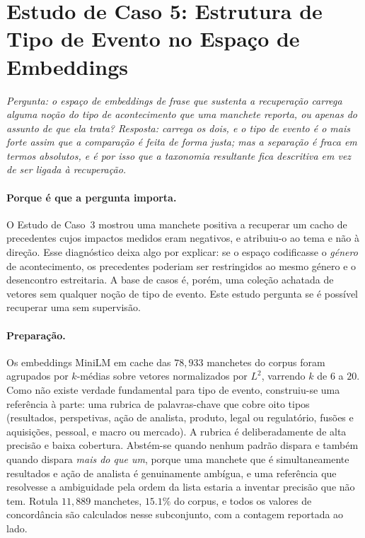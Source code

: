 \section{Estudo de Caso 5: Estrutura de Tipo de Evento no Espaço de Embeddings}
\label{sec:cs_taxonomy}

\emph{Pergunta: o espaço de embeddings de frase que sustenta a recuperação carrega alguma noção do
\emph{tipo de acontecimento} que uma manchete reporta, ou apenas do assunto de que ela trata?
Resposta: carrega os dois, e o tipo de evento é o mais forte assim que a comparação é feita de forma
justa; mas a separação é fraca em termos absolutos, e é por isso que a taxonomia resultante fica
descritiva em vez de ser ligada à recuperação.}

\paragraph{Porque é que a pergunta importa.} O Estudo de Caso~3 mostrou uma manchete positiva a
recuperar um cacho de precedentes cujos impactos medidos eram negativos, e atribuiu-o ao tema e não à
direção. Esse diagnóstico deixa algo por explicar: se o espaço codificasse o \emph{género} de
acontecimento, os precedentes poderiam ser restringidos ao mesmo género e o desencontro estreitaria.
A base de casos é, porém, uma coleção achatada de vetores sem qualquer noção de tipo de evento. Este
estudo pergunta se é possível recuperar uma sem supervisão.

\paragraph{Preparação.} Os embeddings MiniLM em cache das $78{,}933$ manchetes do corpus foram
agrupados por $k$-médias sobre vetores normalizados por $L^2$, varrendo $k$ de $6$ a $20$. Como não
existe verdade fundamental para tipo de evento, construiu-se uma referência à parte: uma rubrica de
palavras-chave que cobre oito tipos (resultados, perspetivas, ação de analista, produto, legal ou
regulatório, fusões e aquisições, pessoal, e macro ou mercado). A rubrica é deliberadamente de alta
precisão e baixa cobertura. Abstém-se quando nenhum padrão dispara e também quando dispara
\emph{mais do que um}, porque uma manchete que é simultaneamente resultados e ação de analista é
genuinamente ambígua, e uma referência que resolvesse a ambiguidade pela ordem da lista estaria a
inventar precisão que não tem. Rotula $11{,}889$ manchetes, $15.1\%$ do corpus, e todos os valores de
concordância são calculados nesse subconjunto, com a contagem reportada ao lado.

